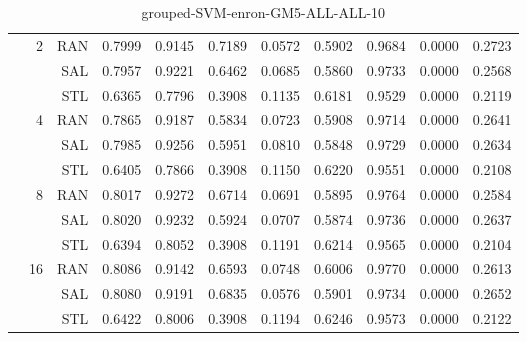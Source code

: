 \begin{center}
\begin{table}[htbp]
\begin{center}
\begin{tabular}{ | r | r | r | r | r | r | r | r | r | r | r |}
 & \multirow{3}{*}{2} & RAN & 0.7999 & 0.9145 & 0.7189 & 0.0572 & 0.5902 & 0.9684 & 0.0000 & 0.2723\\ \cline{3-11}
 &   & SAL & 0.7957 & 0.9221 & 0.6462 & 0.0685 & 0.5860 & 0.9733 & 0.0000 & 0.2568\\ \cline{3-11}
 &   & STL & 0.6365 & 0.7796 & 0.3908 & 0.1135 & 0.6181 & 0.9529 & 0.0000 & 0.2119\\ \cline{2-11}
 & \multirow{3}{*}{4} & RAN & 0.7865 & 0.9187 & 0.5834 & 0.0723 & 0.5908 & 0.9714 & 0.0000 & 0.2641\\ \cline{3-11}
 &   & SAL & 0.7985 & 0.9256 & 0.5951 & 0.0810 & 0.5848 & 0.9729 & 0.0000 & 0.2634\\ \cline{3-11}
 &   & STL & 0.6405 & 0.7866 & 0.3908 & 0.1150 & 0.6220 & 0.9551 & 0.0000 & 0.2108\\ \cline{2-11}
 & \multirow{3}{*}{8} & RAN & 0.8017 & 0.9272 & 0.6714 & 0.0691 & 0.5895 & 0.9764 & 0.0000 & 0.2584\\ \cline{3-11}
 &   & SAL & 0.8020 & 0.9232 & 0.5924 & 0.0707 & 0.5874 & 0.9736 & 0.0000 & 0.2637\\ \cline{3-11}
 &   & STL & 0.6394 & 0.8052 & 0.3908 & 0.1191 & 0.6214 & 0.9565 & 0.0000 & 0.2104\\ \cline{2-11}
 & \multirow{3}{*}{16} & RAN & 0.8086 & 0.9142 & 0.6593 & 0.0748 & 0.6006 & 0.9770 & 0.0000 & 0.2613\\ \cline{3-11}
 &   & SAL & 0.8080 & 0.9191 & 0.6835 & 0.0576 & 0.5901 & 0.9734 & 0.0000 & 0.2652\\ \cline{3-11}
 &   & STL & 0.6422 & 0.8006 & 0.3908 & 0.1194 & 0.6246 & 0.9573 & 0.0000 & 0.2122\\ \cline{2-11}
\hline
\end{tabular}
\caption{grouped-SVM-enron-GM5-ALL-ALL-10}
\end{center}
 \end{table}
\end{center}

